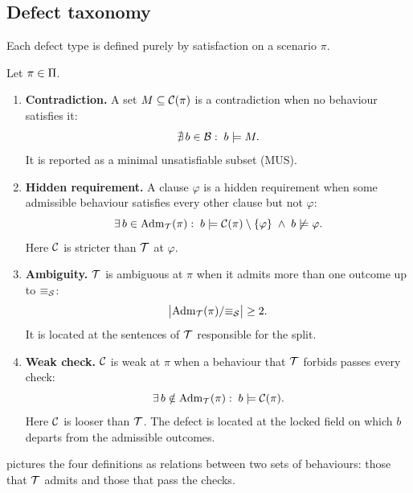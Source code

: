 \subsection{Defect taxonomy}

Each defect type is defined purely by satisfaction on a scenario $\pi$.

\begin{definition}
\label{def:defects}
Let $\pi\in\Pi$.
\begin{enumerate}[leftmargin=*,label=(\roman*)]
\item \textbf{Contradiction.} A set $M\subseteq\mathcal{C}(\pi)$ is a contradiction when no behaviour satisfies it:
  \begin{equation}\label{eq:def-con}
  \nexists\,b\in\mathcal{B}:\;b\models M .
  \end{equation}
  It is reported as a minimal unsatisfiable subset (MUS).
\item \textbf{Hidden requirement.} A clause $\varphi$ is a hidden requirement when some admissible behaviour satisfies every other clause but not $\varphi$:
  \begin{equation}\label{eq:def-hid}
  \exists\,b\in\mathrm{Adm}_{\mathcal{T}}(\pi):\;b\models\mathcal{C}(\pi)\setminus\{\varphi\}\;\wedge\;b\not\models\varphi .
  \end{equation}
  Here $\mathcal{C}$ is stricter than $\mathcal{T}$ at $\varphi$.
\item \textbf{Ambiguity.} $\mathcal{T}$ is ambiguous at $\pi$ when it admits more than one outcome up to $\equiv_{\mathcal{S}}$:
  \begin{equation}\label{eq:def-amb}
  \bigl|\mathrm{Adm}_{\mathcal{T}}(\pi)/{\equiv_{\mathcal{S}}}\bigr|\ge 2 .
  \end{equation}
  It is located at the sentences of $\mathcal{T}$ responsible for the split.
\item \textbf{Weak check.} $\mathcal{C}$ is weak at $\pi$ when a behaviour that $\mathcal{T}$ forbids passes every check:
  \begin{equation}\label{eq:def-weak}
  \exists\,b\notin\mathrm{Adm}_{\mathcal{T}}(\pi):\;b\models\mathcal{C}(\pi) .
  \end{equation}
  Here $\mathcal{C}$ is looser than $\mathcal{T}$. The defect is located at the locked field on which $b$ departs from the admissible outcomes.
\end{enumerate}
\end{definition}

 pictures the four definitions as relations between two sets of behaviours: those that $\mathcal{T}$ admits and those that pass the checks.

